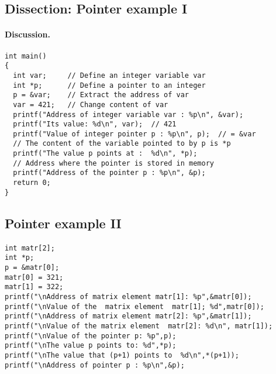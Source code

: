 \documentclass[%
oneside,                 %
final,                   %
10pt]{article}
\begin{document}
\subsection*{Dissection: Pointer example I}


\paragraph{Discussion.}

\begin{verbatim}
int main()
{
  int var;     // Define an integer variable var
  int *p;      // Define a pointer to an integer
  p = &var;    // Extract the address of var
  var = 421;   // Change content of var
  printf("Address of integer variable var : %p\n", &var);
  printf("Its value: %d\n", var);  // 421
  printf("Value of integer pointer p : %p\n", p);  // = &var
  // The content of the variable pointed to by p is *p
  printf("The value p points at :  %d\n", *p);
  // Address where the pointer is stored in memory
  printf("Address of the pointer p : %p\n", &p);
  return 0;
}
\end{verbatim}



\subsection*{Pointer example II}


\paragraph{}
\begin{verbatim}
int matr[2];
int *p;
p = &matr[0];
matr[0] = 321;
matr[1] = 322;
printf("\nAddress of matrix element matr[1]: %p",&matr[0]);
printf("\nValue of the  matrix element  matr[1]; %d",matr[0]);
printf("\nAddress of matrix element matr[2]: %p",&matr[1]);
printf("\nValue of the matrix element  matr[2]: %d\n", matr[1]);
printf("\nValue of the pointer p: %p",p);
printf("\nThe value p points to: %d",*p);
printf("\nThe value that (p+1) points to  %d\n",*(p+1));
printf("\nAddress of pointer p : %p\n",&p);
\end{verbatim}
\end{document}
